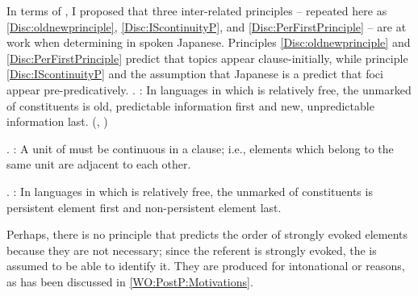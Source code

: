 In terms of ,
I proposed that three inter-related principles -- repeated here as \ref{Disc:oldnewprinciple}, \ref{Disc:IScontinuityP}, and \ref{Disc:PerFirstPrinciple} -- are at work when determining  in spoken Japanese.
Principles \ref{Disc:oldnewprinciple} and \ref{Disc:PerFirstPrinciple}
predict that topics appear clause-initially,
while principle \ref{Disc:IScontinuityP} and the assumption that Japanese is a  predict that
foci appear pre-predicatively.
%
\ex. \label{Disc:oldnewprinciple}:
 In languages in which  is relatively free,
 the unmarked  of constituents is old,
 predictable information first and new, unpredictable information last.
 \hfill{(, )}

\ex. \label{Disc:IScontinuityP}:
 A unit of  must be continuous in a clause;
 i.e., elements which belong to the same unit are adjacent to each other.

\ex. \label{Disc:PerFirstPrinciple}:
 In languages in which  is relatively free,
 the unmarked  of constituents is persistent element first and non-persistent element last.

Perhaps, there is no principle that predicts the order of strongly evoked elements because they are not necessary;
since the referent is strongly evoked, the  is assumed to be able to identify it.
They are produced for intonational or  reasons,
as has been discussed in \ref{WO:PostP:Motivations}.

